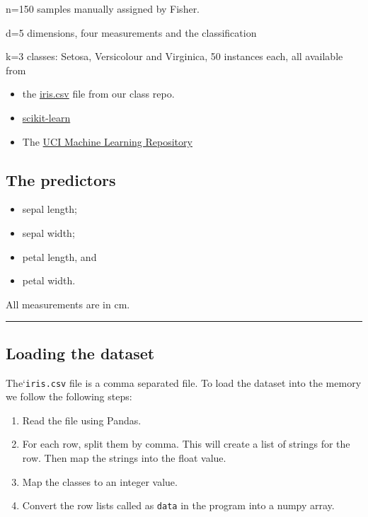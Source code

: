 \documentclass[
  letterpaper,
  DIV=11,
  numbers=noendperiod]{scrartcl}
\providecommand{\tightlist}{%
  \setlength{\itemsep}{0pt}\setlength{\parskip}{0pt}}\usepackage{longtable,booktabs,array}
\begin{document}
n=150 samples manually assigned by Fisher.

d=5 dimensions, four measurements and the classification

k=3 classes: Setosa, Versicolour and Virginica, 50 instances each, all
available from

\begin{itemize}
\item
  the \href{./data/iris.csv}{iris.csv} file from our class repo.
\item
  \href{https://scikit-learn.org/stable/auto_examples/datasets/plot_iris_dataset.html}{scikit-learn}
\item
  The \href{https://archive.ics.uci.edu/ml/datasets/iris}{UCI Machine
  Learning Repository}
\end{itemize}

\subsection{The predictors}\label{the-predictors}

\begin{itemize}
\tightlist
\item
  sepal length;
\item
  sepal width;
\item
  petal length, and
\item
  petal width.
\end{itemize}

All measurements are in cm.

\begin{center}\rule{0.5\linewidth}{0.5pt}\end{center}

\subsection{Loading the dataset}\label{loading-the-dataset}

The`\texttt{iris.csv} file is a comma separated file. To load the
dataset into the memory we follow the following steps:

\begin{enumerate}
\def\labelenumi{\arabic{enumi}.}
\tightlist
\item
  Read the file using Pandas.
\item
  For each row, split them by comma. This will create a list of strings
  for the row. Then map the strings into the float value.
\item
  Map the classes to an integer value.
\item
  Convert the row lists called as \texttt{data} in the program into a
  numpy array.
\end{enumerate}
\end{document}
